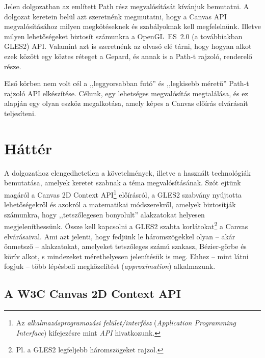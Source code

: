 \documentclass[12pt]{report}
\theoremstyle{definition}
\newcommand{\inenglish}[1]{\textsl{#1}}
\begin{document}
Jelen dolgozatban az említett Path rész megvalósítását kívánjuk bemutatni. A
dolgozat keretein belül azt szeretnénk megmutatni, hogy a Canvas API
megvalósításához milyen megkötéseknek és szabályoknak kell megfelelnünk.
Illetve milyen lehetőségeket biztosít számunkra a OpenGL~ES~2.0 (a továbbiakban
GLES2) API. Valamint azt is szeretnénk az olvasó elé tárni, hogy hogyan alkot
ezek között egy köztes réteget a Gepard, és annak is a Path-t rajzoló,
renderelő része.

Első körben nem volt cél a ,,leggyorsabban futó'' és ,,legkisebb méretű''
Path-t rajzoló API elkészítése. Célunk, egy lehetséges megvalósítás
megtalálása, és ez alapján egy olyan eszköz megalkotása, amely képes a Canvas
előírás elvárásait teljesíteni.



    \chapter{Háttér}
    \label{sec:Hatter}

A dolgozathoz elengedhetetlen a követelmények, illetve a használt technológiák
bemutatása, amelyek keretet szabnak a téma megvalósításának. Szót ejtünk
magáról a Canvas 2D Context API\footnote{Az \emph{alkalmazásprogramozási
felület/interfész} (\inenglish{Application Programming Interface}) kifejezésre
mint \emph{API} hivatkozunk.} előírásról, a GLES2 szabvány nyújtotta
lehetőségekről és azokról a matematikai módszerekről, amelyek biztosítják
számunkra, hogy ,,tetszőlegesen bonyolult'' alakzatokat helyesen
megjeleníthessünk. Össze kell kapcsolni a GLES2 szabta korlátokat\footnote {Pl.
a GLES2 legfeljebb háromszögeket rajzol.} a Canvas elvárásaival. Ami azt
jelenti, hogy fedjünk le háromszögekkel olyan -- akár önmetsző -- alakzatokat,
amelyeket tetszőleges számú szakasz, Bézier-görbe és körív alkot, s
mindezeket mérethelyesen jelenítésük is meg. Ehhez -- mint látni fogjuk -- több
lépésbeli megközelítést (\inenglish{approximation}) alkalmazunk.

    \section[A Canvas 2D Context API]{A W3C Canvas 2D Context API}
    \label{sec:A_Canvas_előírás}
\end{document}
